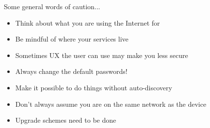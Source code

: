 \begin{frame}
	{Some general words of caution...}

	\begin{itemize}
		\item Think about what you are using the Internet for
		\item Be mindful of where your services live
		\item Sometimes UX the user can use may make you less secure
		\item Always change the default passwords!
		\item Make it possible to do things without auto-discovery
		\item Don’t always assume you are on the same network as the device
		\item Upgrade schemes need to be done
	\end{itemize}

\end{frame}

\cprotect\note{
}

